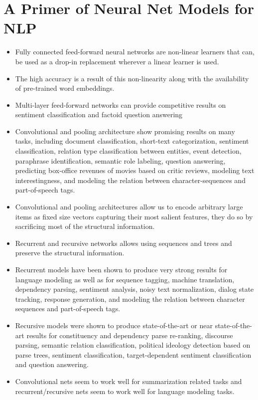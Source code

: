 \documentclass[11pt,a4paper]{article}
\begin{document}



\section{A Primer of Neural Net Models for NLP} %
\label{sec:a_primer_of_neural_net_models_for_nlp}

  \begin{itemize}
    \item 
    Fully connected feed-forward neural networks are non-linear learners that can, be used as a drop-in replacement wherever a linear learner is used.
    \item 
    The high accuracy is a result of this non-linearity along with the availability of pre-trained word embeddings.
    \item 
    Multi-layer feed-forward networks can provide competitive results on sentiment classification and factoid question answering
    \item 
    Convolutional and pooling architecture show promising results on many tasks, including document classification, short-text categorization, sentiment classification, relation type classification between entities, event detection, paraphrase identification, semantic role labeling, question answering, predicting box-office revenues of movies based on critic reviews, modeling text interestingness, and modeling the relation between character-sequences and part-of-speech tags.
    \item 
    Convolutional and pooling architectures allow us to encode arbitrary large items as fixed size vectors capturing their most salient features, they do so by sacrificing most of the structural information.
    \item 
    Recurrent and recursive networks allows using sequences and trees and preserve the structural information.
    \item 
    Recurrent models have been shown to produce very strong results for language modeling as well as for sequence tagging, machine translation, dependency parsing, sentiment analysis, noisy text normalization, dialog state tracking, response generation, and modeling the relation between character sequences and part-of-speech tags. 
    \item 
    Recursive models were shown to produce state-of-the-art or near state-of-the-art results for constituency and dependency parse re-ranking, discourse parsing, semantic relation classification, political ideology detection based on parse trees, sentiment classification, target-dependent sentiment classification and question answering.
    \item 
    Convolutional nets seem to work well for summarization related tasks and recurrent/recursive nets seem to work well for language modeling tasks.
  \end{itemize}
\end{document}
